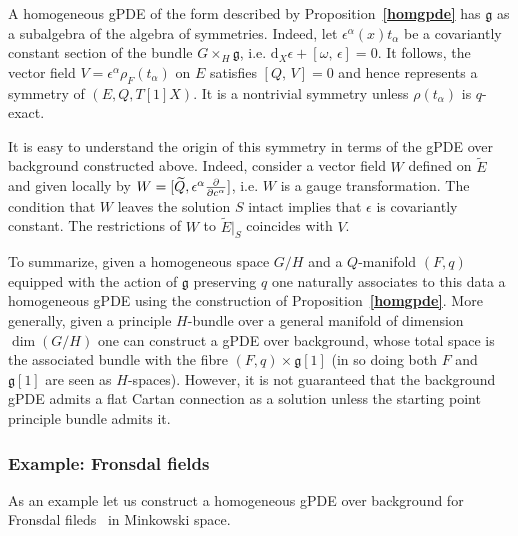 \documentclass[a4paper,12pt]{article}
\numberwithin{equation}{section} %
\renewcommand{\tilde}{\widetilde}
\newcommand{\bref}[1]{\textbf{\ref{#1}}}
\newcommand{\dx}{\mathrm{d}_X}
\renewcommand{\d}{\partial}
\newcommand{\commut}[2]{[#1{,}\,#2]}
\newcommand{\ffrac}[2]{\raisebox{.5pt}%
  {\footnotesize$\displaystyle\frac{#1}{#2}$}\kern1pt}
\newcommand{\dl}[1]{\mathchoice{\ffrac{\d}{\d #1}}{\frac{\d}{\d #1}}{\ffrac{\d}{\d #1}}{\ffrac{\d}{\d #1}}}
\newcommand{\Liealg}{\mathfrak}
\newcommand{\algg}{\Liealg{g}}
\begin{document}
A homogeneous gPDE of the form described by Proposition~\bref{homgpde} has $\algg$ as a subalgebra of the algebra of symmetries. Indeed, let $\epsilon^\alpha(x)t_\alpha$ be a covariantly constant section of the bundle $G\times_H \algg$, i.e. $\dx\epsilon+\commut{\omega}{\epsilon}=0$.  It follows, the vector field $V=\epsilon^{\alpha}\rho_F(t_\alpha)$ on $E$ satisfies $\commut{Q}{V}=0$ and hence represents a symmetry of $(E,Q,T[1]X)$. It is a nontrivial symmetry unless $\rho(t_\alpha)$ is $q$-exact. 

 

It is easy to understand the origin of this symmetry in terms of the gPDE over background constructed above. Indeed, consider a vector field $W$ defined on $\tilde E$ and given locally by
$W=\commut{\tilde Q}{\epsilon^\alpha\dl{c^\alpha}}$, i.e. $W$ is a gauge transformation. The condition that $W$ leaves the solution $S$ intact implies that $\epsilon$ is covariantly constant. The restrictions of $W$ to $\tilde E|_S$ coincides with $V$. 

To summarize, given a homogeneous space $G/H$ and a $Q$-manifold $(F,q)$ equipped with the action of $\algg$ preserving $q$ one naturally associates to this data a homogeneous gPDE using the construction of Proposition~\bref{homgpde}. More generally, given a principle $H$-bundle over a general manifold of dimension $\dim(G/H)$
one can construct a gPDE over background, whose total space is the associated bundle with the fibre $(F,q)\times\algg[1]$ (in so doing both $F$ and $\algg[1]$ are seen as $H$-spaces). However, it is not guaranteed that the background gPDE admits a flat Cartan connection as a solution unless the  starting point principle bundle admits it. 


\subsubsection{Example: Fronsdal fields}
As an example let us construct a homogeneous gPDE over background for Fronsdal fileds~\cite{Fronsdal:1978rb} in Minkowski space.
\end{document}
